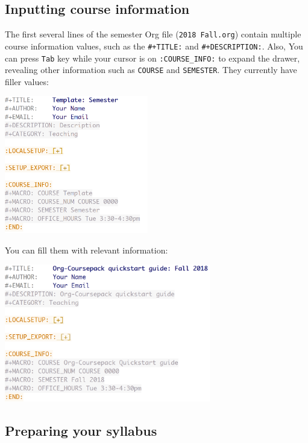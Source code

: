\documentclass[10pt,article]{article}
\begin{document}
\subsection{Inputting course information}
\label{sec:orge6a2158}
The first several lines of the semester Org file (\texttt{2018 Fall.org}) contain
multiple course information values, such as the \texttt{\#+TITLE:} and
\texttt{\#+DESCRIPTION:}. Also, You can press \texttt{Tab} key while your cursor is on
\texttt{:COURSE\_INFO:} to expand the drawer, revealing other information such as
\texttt{COURSE} and \texttt{SEMESTER}. They currently have filler values:

\begin{center}
\includegraphics[height=6cm]{../../../Assets/Images/Org-Teaching/Quickstart_Semester-Course-Info.png}
\end{center}

You can fill them with relevant information:

\begin{center}
\includegraphics[height=6cm]{../../../Assets/Images/Org-Teaching/Quickstart_Semester-Course-Info-Edited.png}
\end{center}
\subsection{Preparing your syllabus}
\label{sec:org8230666}
\end{document}
